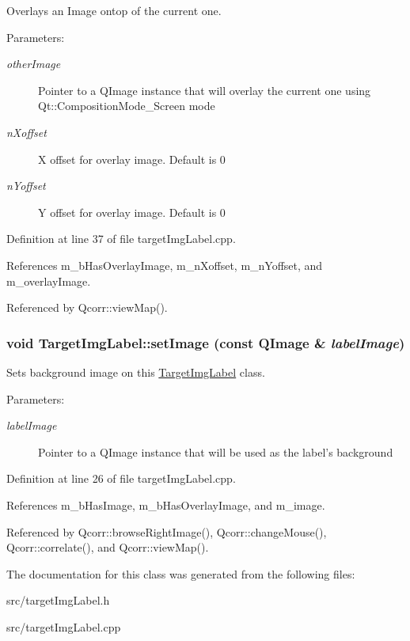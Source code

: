Overlays an Image ontop of the current one. 

\begin{Desc}
\item[Parameters:]
\begin{description}
\item[{\em otherImage}]Pointer to a QImage instance that will overlay the current one using Qt::CompositionMode\_\-Screen mode \item[{\em nXoffset}]X offset for overlay image. Default is 0 \item[{\em nYoffset}]Y offset for overlay image. Default is 0 \end{description}
\end{Desc}


Definition at line 37 of file targetImgLabel.cpp.

References m\_\-bHasOverlayImage, m\_\-nXoffset, m\_\-nYoffset, and m\_\-overlayImage.

Referenced by Qcorr::viewMap().\hypertarget{classTargetImgLabel_2ec40d8850e3d9cc4d5c9984412c0cfb}{
\subsubsection[{setImage}]{\setlength{\rightskip}{0pt plus 5cm}void TargetImgLabel::setImage (const QImage \& {\em labelImage})}}
\label{classTargetImgLabel_2ec40d8850e3d9cc4d5c9984412c0cfb}


Sets background image on this \hyperlink{classTargetImgLabel}{TargetImgLabel} class. 

\begin{Desc}
\item[Parameters:]
\begin{description}
\item[{\em labelImage}]Pointer to a QImage instance that will be used as the label's background \end{description}
\end{Desc}


Definition at line 26 of file targetImgLabel.cpp.

References m\_\-bHasImage, m\_\-bHasOverlayImage, and m\_\-image.

Referenced by Qcorr::browseRightImage(), Qcorr::changeMouse(), Qcorr::correlate(), and Qcorr::viewMap().

The documentation for this class was generated from the following files:\begin{CompactItemize}
\item 
src/targetImgLabel.h\item 
src/targetImgLabel.cpp\end{CompactItemize}
